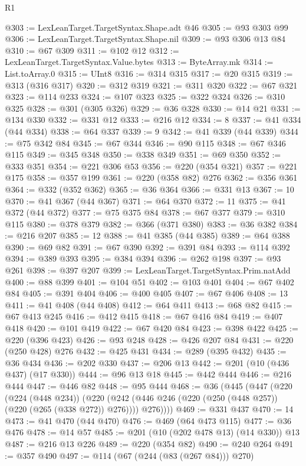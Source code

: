 \begin{lexlean}{R1}
\begin{coremodule}
{{{{{{{{{{{{{{{{{{{{{{{{{{{{{{{{{{{{{{{{@303 := LexLeanTarget.TargetSyntax.Shape.adt @46
@305 := @93 @303 @99
@306 := LexLeanTarget.TargetSyntax.Shape.nil
@309 := @93 @306 @13 @84
@310 := @67 @309
@311 := @102 @12
@312 := LexLeanTarget.TargetSyntax.Value.bytes
@313 := ByteArray.mk
@314 := List.toArray.{0}
@315 := UInt8
@316 := @314 @315
@317 := @20 @315
@319 := @313 (@316 @317)
@320 := @312 @319
@321 := @311 @320
@322 := @67 @321
@323 := @114 @233
@324 := @107 @323
@325 := @322 @324
@326 := @310 @325
@328 := @301 (@305 @326)
@329 := @36 @328
@330 := @14 @21
@331 := @134 @330
@332 := @331 @12
@333 := @216 @12
@334 := 8
@337 := @41 @334 (@44 @334)
@338 := @64 @337
@339 := 9
@342 := @41 @339 (@44 @339)
@344 := @75 @342 @84
@345 := @67 @344
@346 := @90 @115
@348 := @67 @346 @115
@349 := @345 @348
@350 := @338 @349
@351 := @69 @350
@352 := @333 @351
@354 := @221 @306 @53
@356 := @220 (@354 @321)
@357 := @221 @175
@358 := @357 @199
@361 := @220 (@358 @82) @276
@362 := @356 @361
@364 := @332 (@352 @362)
@365 := @36 @364
@366 := @331 @13
@367 := 10
@370 := @41 @367 (@44 @367)
@371 := @64 @370
@372 := 11
@375 := @41 @372 (@44 @372)
@377 := @75 @375 @84
@378 := @67 @377
@379 := @310 @115
@380 := @378 @379
@382 := @366 (@371 @380)
@383 := @36 @382
@384 := @216 @207
@385 := 12
@388 := @41 @385 (@44 @385)
@389 := @64 @388
@390 := @69 @82
@391 := @67 @390
@392 := @391 @84
@393 := @114 @392
@394 := @389 @393
@395 := @384 @394
@396 := @262 @198
@397 := @93 @261
@398 := @397 @207
@399 := LexLeanTarget.TargetSyntax.Prim.natAdd
@400 := @88 @399
@401 := @104 @51
@402 := @103 @401
@404 := @67 @402 @84
@405 := @391 @404
@406 := @400 @405
@407 := @67 @406
@408 := 13
@411 := @41 @408 (@44 @408)
@412 := @64 @411
@413 := @68 @82
@415 := @67 @413 @245
@416 := @412 @415
@418 := @67 @416 @84
@419 := @407 @418
@420 := @101 @419
@422 := @67 @420 @84
@423 := @398 @422
@425 := @220 (@396 @423)
@426 := @93 @248
@428 := @426 @207 @84
@431 := @220 (@250 @428) @276
@432 := @425 @431
@434 := @289 (@395 @432)
@435 := @36 @434
@436 := @202 @330
@437 := @206 @13
@442 := @201 (@10 (@436 @437) (@17 @330))
@444 := @96 @13 @18
@445 := @442 @444
@446 := @216 @444
@447 := @446 @82
@448 := @95 @444
@468 := @36
    (@445
      (@447
        (@220
          (@224 (@448 @234))
          (@220 (@242 (@446 @246 (@220 (@250 (@448 @257)) (@220 (@265 (@338 @272)) @276)))) @276))))
@469 := @331 @437
@470 := 14
@473 := @41 @470 (@44 @470)
@476 := @469 (@64 @473 @115)
@477 := @36 @476
@478 := @14 @57
@485 := @201 (@10 (@202 @478 @13) (@14 @330)) @13
@487 := @216 @13 @226
@489 := @220 (@354 @82)
@490 := @240 @264
@491 := @357 @490
@497 := @114 (@67 (@244 (@83 (@267 @84))) @270)
}}}}}}}}}}}}}}}}}}}}}}}}}}}}}}}}}}}}}}}}
\end{coremodule}
\end{lexlean}
